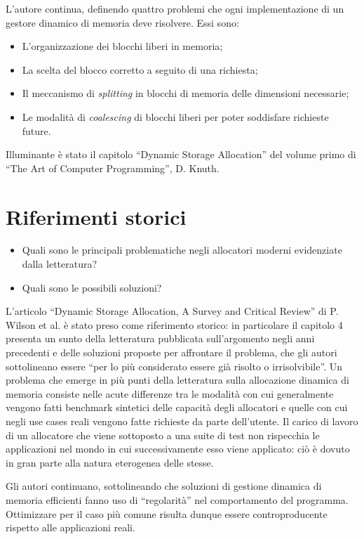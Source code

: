 L’autore continua, definendo quattro problemi che ogni implementazione di un gestore dinamico di memoria deve risolvere. Essi sono:
\begin{itemize}
  \item L’organizzazione dei blocchi liberi in memoria;
  \item La scelta del blocco corretto a seguito di una richiesta;
  \item Il meccanismo di \textit{splitting} in blocchi di memoria delle dimensioni necessarie;
  \item Le modalità di \textit{coalescing} di blocchi liberi per poter soddisfare richieste future.
\end{itemize}

Illuminante è stato il capitolo ``Dynamic Storage Allocation'' del volume primo di ``The Art of Computer Programming'', D. Knuth.

\section{Riferimenti storici}
\begin{itemize}
  \item Quali sono le principali problematiche negli allocatori moderni evidenziate dalla letteratura?
  \item Quali sono le possibili soluzioni?
\end{itemize}

L’articolo ``Dynamic Storage Allocation, A Survey and Critical Review'' di P. Wilson et al. è stato preso come riferimento storico: in particolare il capitolo 4 presenta un sunto della letteratura pubblicata sull’argomento negli anni precedenti e delle soluzioni proposte per affrontare il problema, che gli autori sottolineano essere ``per lo più considerato essere già risolto o irrisolvibile''. Un problema che emerge in più punti della letteratura sulla allocazione dinamica di memoria consiste nelle acute differenze tra le modalità con cui generalmente vengono fatti benchmark sintetici delle capacità degli allocatori e quelle con cui negli use cases reali vengono fatte richieste da parte dell’utente. Il carico di lavoro di un allocatore che viene sottoposto a una suite di test non rispecchia le applicazioni nel mondo in cui successivamente esso viene applicato: ciò è dovuto in gran parte alla natura eterogenea delle stesse.

Gli autori continuano, sottolineando che soluzioni di gestione dinamica di memoria efficienti fanno uso di ``regolarità'' nel comportamento del programma. Ottimizzare per il caso più comune risulta dunque essere controproducente rispetto alle applicazioni reali.

